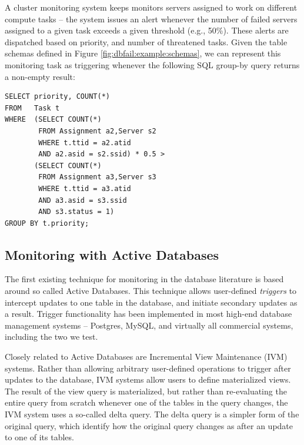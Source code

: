 \begin{example}
\label{ex:dbfail:network}
A cluster monitoring system keeps monitors servers assigned to work on different compute tasks -- the system issues an alert whenever the number of failed servers assigned to a given task exceeds a given threshold (e.g., 50\%).  These alerts are dispatched based on priority, and number of threatened tasks.  Given the table schemas defined in Figure \ref{fig:dbfail:example:schemas}, we can represent this monitoring task as triggering whenever the following SQL group-by query returns a non-empty result:
\begin{verbatim}
SELECT priority, COUNT(*)
FROM   Task t
WHERE  (SELECT COUNT(*) 
        FROM Assignment a2,Server s2
        WHERE t.ttid = a2.atid 
        AND a2.asid = s2.ssid) * 0.5 > 
       (SELECT COUNT(*) 
        FROM Assignment a3,Server s3
        WHERE t.ttid = a3.atid 
        AND a3.asid = s3.ssid 
        AND s3.status = 1)
GROUP BY t.priority;
\end{verbatim}
\end{example}

\subsection{Monitoring with Active Databases}
The first existing technique for monitoring in the database literature is based around so called Active Databases\cite{?}.  This technique allows user-defined {\em triggers} to intercept updates to one table in the database, and initiate secondary updates as a result.  Trigger functionality has been implemented in most high-end database management systems -- Postgres\cite{?}, MySQL\cite{?}, and virtually all commercial systems, including the two we test.

Closely related to Active Databases are Incremental View Maintenance\cite{?} (IVM) systems.  Rather than allowing arbitrary user-defined operations to trigger after updates to the database, IVM systems allow users to define materialized views.  The result of the view query is materialized, but rather than re-evaluating the entire query from scratch whenever one of the tables in the query changes, the IVM system uses a so-called delta query.  The delta query is a simpler form of the original query, which identify how the original query changes as after an update to one of its tables.  

